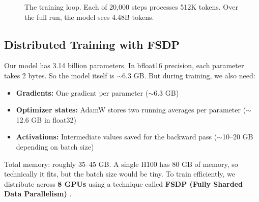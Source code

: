 \documentclass[11pt,a4paper]{article}
\begin{document}
\begin{figure}[H]
\centering
{}
\caption{The training loop. Each of 20,000 steps processes 512K tokens. Over the full run, the model sees 4.48B tokens.}
\label{fig:training_loop}
\end{figure}

\subsection{Distributed Training with FSDP}

Our model has 3.14 billion parameters. In bfloat16 precision, each parameter takes 2 bytes. So the model itself is $\sim$6.3 GB. But during training, we also need:

\begin{itemize}
    \item \textbf{Gradients:} One gradient per parameter ($\sim$6.3 GB)
    \item \textbf{Optimizer states:} AdamW stores two running averages per parameter ($\sim$12.6 GB in float32)
    \item \textbf{Activations:} Intermediate values saved for the backward pass ($\sim$10--20 GB depending on batch size)
\end{itemize}

Total memory: roughly 35--45 GB. A single H100 has 80 GB of memory, so technically it fits, but the batch size would be tiny. To train efficiently, we distribute across \textbf{8 GPUs} using a technique called \textbf{FSDP (Fully Sharded Data Parallelism)} \citep{zhao2023fsdp}.
\end{document}
